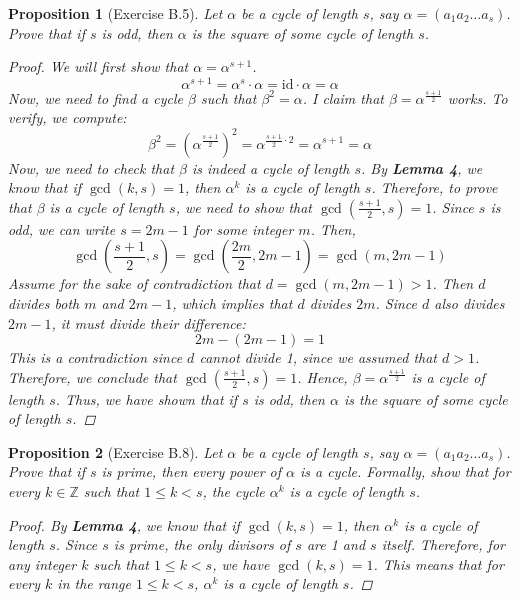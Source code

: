\documentclass[12pt]{article}
\newcommand{\Z}{\mathbb{Z}} %
\newtheorem{proposition}{Proposition}
\begin{document}
\begin{proposition}[Exercise B.5]
  Let $\alpha$ be a cycle of length $s$, say $\alpha = (a_1 a_2 \ldots a_s)$.
  Prove that if $s$ is odd, then $\alpha$ is the square of some cycle of length $s$.
  \begin{proof}
    We will first show that $\alpha = \alpha^{s + 1}$.
    \[
      \alpha^{s + 1} = \alpha^s \cdot \alpha = \text{id} \cdot \alpha = \alpha
    \]
    Now, we need to find a cycle $\beta$ such that $\beta^2 = \alpha$.
    I claim that $\beta = \alpha^{\frac{s + 1}{2}}$ works.
    To verify, we compute:
    \[
      \beta^2 = \left(\alpha^{\frac{s + 1}{2}}\right)^2 = \alpha^{\frac{s + 1}{2} \cdot 2} = \alpha^{s + 1} = \alpha
    \]
    Now, we need to check that $\beta$ is indeed a cycle of length $s$.
    By \textbf{Lemma 4}, we know that if $\gcd(k, s) = 1$, then $\alpha^k$ is a cycle of length $s$.
    Therefore, to prove that $\beta$ is a cycle of length $s$, we need to show that $\gcd\left(\frac{s + 1}{2}, s\right) = 1$.
    Since $s$ is odd, we can write $s = 2m  - 1$ for some integer $m$.
    Then,
    \[
      \gcd\left(\frac{s + 1}{2}, s\right) = \gcd\left(\frac{2m}{2}, 2m - 1\right) = \gcd(m, 2m - 1)
    \]
    Assume for the sake of contradiction that $d = \gcd(m, 2m - 1) > 1$.
    Then $d$ divides both $m$ and $2m - 1$, which implies that $d$ divides $2m$.
    Since $d$ also divides $2m - 1$, it must divide their difference:
    \[
      2m - (2m - 1) = 1
    \]
    This is a contradiction since $d$ cannot divide 1, since we assumed that $d > 1$.
    Therefore, we conclude that $\gcd\left(\frac{s + 1}{2}, s\right) = 1$.
    Hence, $\beta = \alpha^{\frac{s + 1}{2}}$ is a cycle of length $s$.
    Thus, we have shown that if $s$ is odd, then $\alpha$ is the square of some cycle of length $s$.
  \end{proof}
\end{proposition}


\begin{proposition}[Exercise B.8]
  Let $\alpha$ be a cycle of length $s$, say $\alpha = (a_1 a_2 \ldots a_s)$.
  Prove that if $s$ is prime, then every power of $\alpha$ is a cycle.
  Formally, show that for every $k \in \Z$ such that $1 \leq k < s$, the cycle $\alpha^k$ is a cycle of length $s$.
  \begin{proof}
    By \textbf{Lemma 4}, we know that if $\gcd(k, s) = 1$, then $\alpha^k$ is a cycle of length $s$.
    Since $s$ is prime, the only divisors of $s$ are 1 and $s$ itself.
    Therefore, for any integer $k$ such that $1 \leq k < s$, we have $\gcd(k, s) = 1$.
    This means that for every $k$ in the range $1 \leq k < s$, $\alpha^k$ is a cycle of length $s$.
  \end{proof}
\end{proposition}
\end{document}
